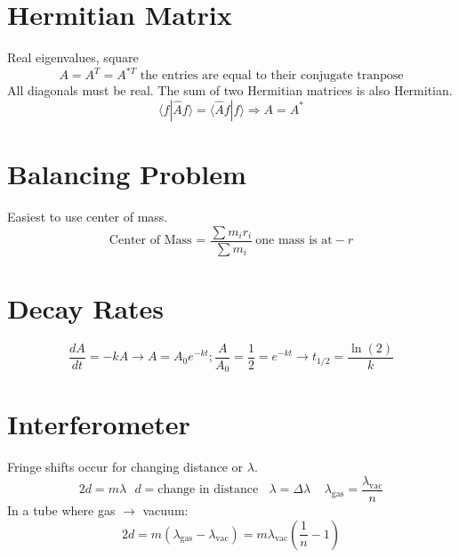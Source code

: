 \documentclass[10pt,letter]{article}
\begin{document}
\section{Hermitian Matrix} %
\label{sec:hermitian_matrix}
Real eigenvalues, square
\begin{equation}
    A = A^T = A^{*T} \textrm{ the entries are equal to their conjugate tranpose}
\end{equation}
All diagonals must be real. The sum of two Hermitian matrices is also Hermitian.
\begin{equation}
    \langle f | \hat{A} f \rangle = \langle \hat{A} f | f \rangle \Rightarrow A = A^*
\end{equation}

\section{Balancing Problem} %
\label{sec:balancing_problem}
Easiest to use center of mass. 
\begin{equation}
    \textrm{Center of Mass = } \frac{\sum m_i r_i}{\sum m_i}~ \textrm{one mass is at}-r
\end{equation}

\section{Decay Rates} %
\label{sec:decay_rates}
\begin{equation}
    \frac{dA}{dt}= -kA \rightarrow A = A_0e^{-kt}; \frac{A}{A_0} = \frac{1}{2}=e^{-kt} \rightarrow t_{1/2} = \frac{\ln(2)}{k}
\end{equation}

\section{Interferometer} %
\label{sec:interferometere}
Fringe shifts occur for changing distance or $\lambda$. 
\begin{equation}
    2d = m\lambda ~~~ d=\textrm{change in distance} ~~~~ \lambda  = \Delta \lambda ~~~~~ \lambda_{\textrm{gas}} = \frac{\lambda_{\textrm{vac}}}{n}
\end{equation}
In a tube where gas $\rightarrow$ vacuum: 
\begin{equation}
    2d = m (\lambda_{\textrm{gas}} - \lambda_{\textrm{vac}}) = m \lambda_{\textrm{vac}} \left( \frac{1}{n} -1  \right) 
\end{equation}
\end{document}
